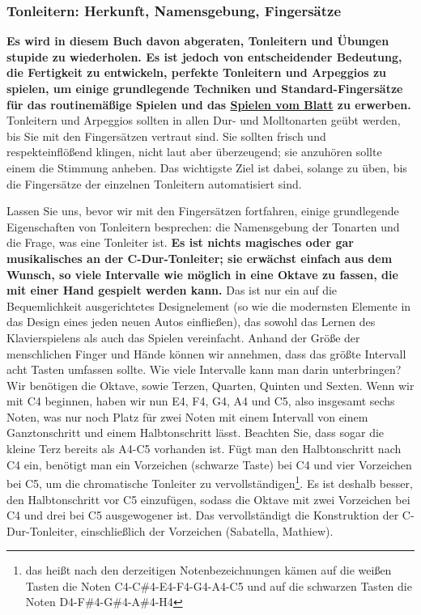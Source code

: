 \subsubsection{Tonleitern: Herkunft, Namensgebung, Fingersätze}
\label{c1iii5d}

\textbf{Es wird in diesem Buch davon abgeraten, Tonleitern und Übungen stupide zu wiederholen.
Es ist jedoch von entscheidender Bedeutung, die Fertigkeit zu entwickeln, perfekte Tonleitern und Arpeggios zu spielen, um einige grundlegende Techniken und Standard-Fingersätze für das routinemäßige Spielen und das \hyperref[c1iii11]{Spielen vom Blatt} zu erwerben.}
Tonleitern und Arpeggios sollten in allen Dur- und Molltonarten geübt werden, bis Sie mit den Fingersätzen vertraut sind.
Sie sollten frisch und respekteinflößend klingen, nicht laut aber überzeugend; sie anzuhören sollte einem die Stimmung anheben.
Das wichtigste Ziel ist dabei, solange zu üben, bis die Fingersätze der einzelnen Tonleitern automatisiert sind. 

Lassen Sie uns, bevor wir mit den Fingersätzen fortfahren, einige grundlegende Eigenschaften von Tonleitern besprechen: die Namensgebung der Tonarten und die Frage, was eine Tonleiter ist.
\textbf{Es ist nichts magisches oder gar musikalisches an der C-Dur-Tonleiter; sie erwächst einfach aus dem Wunsch, so viele Intervalle wie möglich in eine Oktave zu fassen, die mit einer Hand gespielt werden kann.}
Das ist nur ein auf die Bequemlichkeit ausgerichtetes Designelement (so wie die modernsten Elemente in das Design eines jeden neuen Autos einfließen), das sowohl das Lernen des Klavierspielens als auch das Spielen vereinfacht.
Anhand der Größe der menschlichen Finger und Hände können wir annehmen, dass das größte Intervall acht Tasten umfassen sollte.
Wie viele Intervalle kann man darin unterbringen?
Wir benötigen die Oktave, sowie Terzen, Quarten, Quinten und Sexten.
Wenn wir mit C4 beginnen, haben wir nun E4, F4, G4, A4 und C5, also insgesamt sechs Noten, was nur noch Platz für zwei Noten mit einem Intervall von einem Ganztonschritt und einem Halbtonschritt lässt.
Beachten Sie, dass sogar die kleine Terz bereits als A4-C5 vorhanden ist.
Fügt man den Halbtonschritt nach C4 ein, benötigt man ein Vorzeichen (schwarze Taste) bei C4 und vier Vorzeichen bei C5, um die chromatische Tonleiter zu vervollständigen\footnote{das heißt nach den derzeitigen Notenbezeichnungen kämen auf die weißen Tasten die Noten C4-C\#4-E4-F4-G4-A4-C5 und auf die schwarzen Tasten die Noten D4-F\#4-G\#4-A\#4-H4}.
Es ist deshalb besser, den Halbtonschritt vor C5 einzufügen, sodass die Oktave mit zwei Vorzeichen bei C4 und drei bei C5 ausgewogener ist.
Das vervollständigt die Konstruktion der C-Dur-Tonleiter, einschließlich der Vorzeichen (Sabatella, Mathiew).

